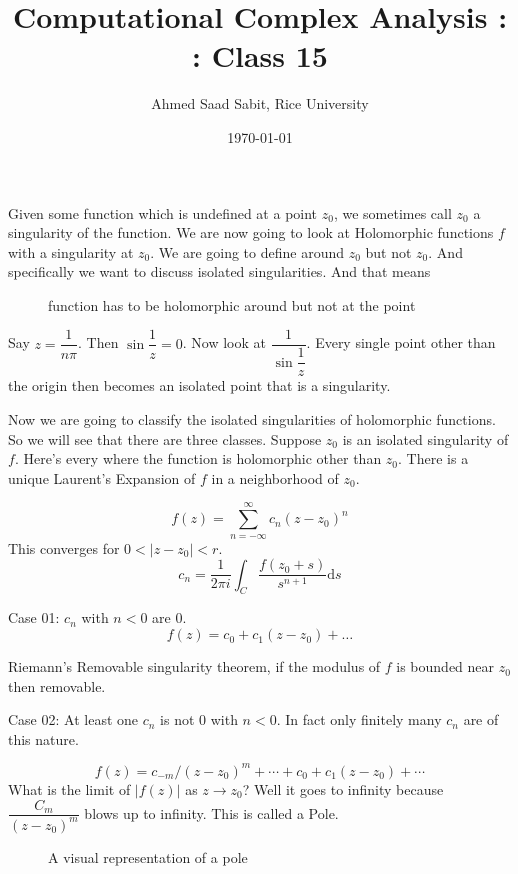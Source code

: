 \documentclass[letter]{article}
\title{Computational Complex Analysis : : Class 15}
\author{Ahmed Saad Sabit, Rice University}
\date{\today}
\renewcommand{\frac}{\dfrac}
\begin{document}
\maketitle

Given some function which is undefined at a point $z_0$, we sometimes call $z_0$ a singularity of the function. We are now going to look at Holomorphic functions $f$ with a singularity at $z_0$. We are going to define around $z_0$ but not $z_0$. And specifically we want to discuss isolated singularities. And that means 

\begin{figure}[ht]
    \centering
    \caption{function has to be holomorphic around but not at the point}
    \label{fig:function-has-to-be-holomorphic-around-but-not-at-the-point}
\end{figure}
 
Say $z = \frac{1}{n \pi }$. Then $\sin \frac{1}{z} = 0$. Now look at $\frac{1}{\sin \frac{1}{z}}$. Every single point other than the origin then becomes an isolated point that is a singularity.

Now we are going to classify the isolated singularities of holomorphic functions. So we will see that there are three classes. Suppose $z_0$ is an isolated singularity of $f$. Here's every where the function is holomorphic other than $z_0$. There is a unique Laurent's Expansion of $f$ in a neighborhood of $z_0$.

\[
f(z) = \sum_{n=-\infty}^{\infty} c_n (z-z_0)^{n}
\]
This converges for $0 < | z -z_0 | < r$. 
\[
c_n = \frac{1}{2\pi i} \int_C \frac{f(z_0 + s)}{s^{n+1}} \mathrm{d} s
\] 

Case 01: $c_n$ with $n<0$ are 0. 
\[
f(z) = c_0 + c_1 (z-z_0)+ \ldots
\] 

Riemann's Removable singularity theorem, if the modulus of $f$ is bounded near $z_0$ then removable. 

Case 02: At least one $c_n$ is not $0$ with $n < 0$. In fact only finitely many $c_n$ are of this nature. 

\[
	f(z) = c_{-m} / (z-z_0)^{m} + \cdots + c_0 + c_1(z-z_0) + \cdots 
\]
What is the limit of $|f(z)|$ as $z \to z_0$? Well it goes to infinity because $\frac{C_m}{(z-z_0)^{m}}$ blows up to infinity. This is called a Pole.

\begin{figure}[ht]
    \centering
    \caption{A visual representation of a pole}
    \label{fig:a-visual-representation-of-a-pole}
\end{figure}
\end{document}
